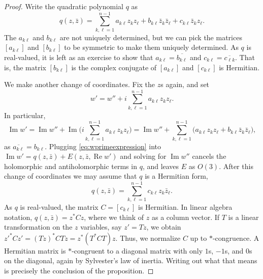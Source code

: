 \documentclass[12pt,openany]{book}
\renewcommand{\Re}{\operatorname{Re}}
\renewcommand{\Im}{\operatorname{Im}}
\theoremstyle{plain}
\theoremstyle{remark}
\theoremstyle{definition}
\theoremstyle{exercise}
\theoremstyle{example}
\begin{document}
\begin{proof}
Write the quadratic polynomial $q$ as
\begin{equation} \label{eq:generalquadraticq}
q(z,\bar{z}) =
\sum_{k,\ell=1}^{n-1}
a_{k\ell} z_kz_\ell
+
b_{k\ell} \bar{z}_k\bar{z}_\ell
+
c_{k\ell} \bar{z}_kz_\ell .
\end{equation}
The $a_{k\ell}$ and $b_{k\ell}$ are not uniquely determined, but
we can pick the matrices $[a_{k\ell}]$ and $[b_{k\ell}]$ to be symmetric
to make them uniquely determined.
As $q$ is real-valued, it is left as an exercise to show that
$a_{k\ell} = \overline{b_{k\ell}}$ and
$c_{k\ell} = \overline{c_{\ell k}}$.  That is, the
matrix $[b_{k\ell}]$ is the complex conjugate of $[a_{k\ell}]$ and
$[c_{k\ell}]$ is Hermitian.

We make another change of coordinates.  Fix the $z$s again, and set
\begin{equation} \label{eq:wprimeexpression}
w' = w'' + i
\sum_{k,\ell=1}^{n-1}
a_{k\ell} z_kz_\ell .
\end{equation}
In particular,
\begin{equation*}
\Im w'
= \Im w''
+ \Im \biggl(
i
\sum_{k,\ell=1}^{n-1}
a_{k\ell} z_kz_\ell
\biggr)
=
\Im w''
+
\sum_{k,\ell=1}^{n-1}
\bigl(
a_{k\ell} z_kz_\ell
+
b_{k\ell} \bar{z}_k\bar{z}_\ell
\bigr) ,
\end{equation*}
as $\overline{a_{k\ell}} = b_{k\ell}$.  Plugging
\eqref{eq:wprimeexpression} into $\Im w' = q(z,\bar{z}) + E(z,\bar{z},\Re w')$
and solving for $\Im w''$ cancels the
holomorphic and antiholomorphic terms in $q$, and leaves $E$ as $O(3)$.
After this change of coordinates we may assume
that $q$ is a Hermitian form,
\begin{equation*}
q(z,\bar{z}) = \sum_{k,\ell=1}^{n-1} c_{k\ell} z_k \bar{z}_\ell .
\end{equation*}
As $q$ is real-valued, the matrix
$C = [ c_{k\ell} ]$ is Hermitian.  In linear algebra notation,
$q(z,\bar{z}) = z^*Cz$,
where we think of $z$ as a column vector.
If $T$ is a linear transformation on the $z$ variables, say $z'=Tz$, we
obtain ${z'}^*Cz' = {(Tz)}^*CTz = z^* ( T^*CT) z$.  Thus, we normalize $C$
up to $*$-congruence.  A Hermitian matrix
is $*$-congruent to a diagonal matrix with only $1$s, $-1$s, and $0$s on the
diagonal, again by Sylvester's law of inertia.  Writing out what that means is precisely the conclusion of the
proposition.
\end{proof}
\end{document}
